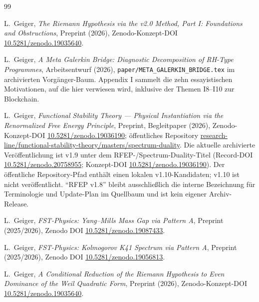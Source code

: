 \documentclass[11pt]{article}
\theoremstyle{definition}
\theoremstyle{remark}
\begin{document}
\begin{thebibliography}{99}


L.~Geiger, \emph{The Riemann Hypothesis via the v2.0 Method,
Part I: Foundations and Obstructions}, Preprint (2026), Zenodo-Konzept-DOI
\href{https://doi.org/10.5281/zenodo.19035640}{10.5281/zenodo.19035640}.

L.~Geiger, \emph{A Meta Galerkin Bridge: Diagnostic Decomposition
of RH-Type Programmes}, Arbeitsentwurf (2026),
\texttt{paper/META\_GALERKIN\_BRIDGE.tex} im archivierten Vorgänger-Baum. Appendix I sammelt
die zehn essayistischen Motivationen, auf die hier verwiesen wird, inklusive der
Themen I8--I10 zur Blockchain.

L.~Geiger, \emph{Functional Stability Theory --- Physical
Instantiation via the Renormalized Free Energy Principle},
Preprint, Begleitpaper (2026), Zenodo-Konzept-DOI
\href{https://doi.org/10.5281/zenodo.19036190}{10.5281/zenodo.19036190};
öffentliches Repository
\href{https://github.com/research-line/functional-stability-theory/tree/main/masters/spectrum-duality}{research-line/functional-stability-theory/masters/spectrum-duality}.
Die aktuelle archivierte Veröffentlichung ist v1.9 unter dem
RFEP-/Spectrum-Duality-Titel (Record-DOI
\href{https://doi.org/10.5281/zenodo.20758955}{10.5281/zenodo.20758955};
Konzept-DOI
\href{https://doi.org/10.5281/zenodo.19036190}{10.5281/zenodo.19036190}).
Der öffentliche Repository-Pfad enthält einen lokalen v1.10-Kandidaten;
v1.10 ist nicht veröffentlicht. ``RFEP v1.8'' bleibt ausschließlich die
interne Bezeichnung für Terminologie und Update-Plan im Quellbaum und ist kein
eigener Archiv-Release.

L.~Geiger, \emph{FST-Physics: Yang--Mills Mass Gap via Pattern A},
Preprint (2025/2026), Zenodo DOI
\href{https://doi.org/10.5281/zenodo.19087433}{10.5281/zenodo.19087433}.

L.~Geiger, \emph{FST-Physics: Kolmogorov K41 Spectrum via
Pattern A}, Preprint (2025/2026), Zenodo DOI
\href{https://doi.org/10.5281/zenodo.19056813}{10.5281/zenodo.19056813}.

L.~Geiger, \emph{A Conditional Reduction of the Riemann Hypothesis to
Even Dominance of the Weil Quadratic Form}, Preprint (2026),
Zenodo-Konzept-DOI
\href{https://doi.org/10.5281/zenodo.19035640}{10.5281/zenodo.19035640}.


\end{thebibliography}
\end{document}
